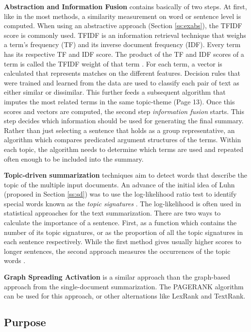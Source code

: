 \textbf{Abstraction and Information Fusion} contains basically of two steps. At first, like in the most methods, a similarity measurement on word or sentence level is computed. When using an abstractive approach (Section \ref{ss:exabs}), the TFIDF score is commonly used. TFIDF is an information retrieval technique that weighs a term’s frequency (TF) and its inverse document frequency (IDF). Every term has its respective TF and IDF score. The product of the TF and IDF scores of a term is called the TFIDF weight of that term \cite{Ramos_usingtf-idf}. For each term, a vector is calculated that represents matches on the different features. Decision rules that were trained and learned from the data are used to classify each pair of text as either similar or dissimilar. This further feeds a subsequent algorithm that imputes the most related terms in the same topic-theme \cite{Das07asurvey} (Page 13). Once this scores and vectors are computed, the second step \textit{information fusion} starts. This step decides which information should be used for generating the final summary. Rather than just selecting a sentence that holds as a group representative, an algorithm which compares predicated argument structures of the terms. Within each topic, the algorithm needs to determine which terms are used and repeated often enough to be included into the summary.

\textbf{Topic-driven summarization} techniques aim to detect words that describe the topic of the multiple input documents. An advance of the initial idea of Luhn (proposed in Section \ref{ss:sd}) was to use the log-likelihood ratio test to identify special words known as the \textit{topic signatures} \cite{textmining1958}. The log-likelihood is often used in statistical approaches for the text summarization. 
There are two ways to calculate the importance of a sentence. First, as a function which contains the number of its topic signatures, or as the proportion of all the topic signatures in each sentence respectively. While the first method gives usually higher scores to longer sentences, the second approach measures the occurrences of the topic words \cite{dunning-1993-accurate}.

\textbf{Graph Spreading Activation} is a similar approach than the graph-based approach from the single-document summarization. The PAGERANK algorithm can be used for this approach, or other alternations like LexRank and TextRank. 


\subsection{Purpose}

